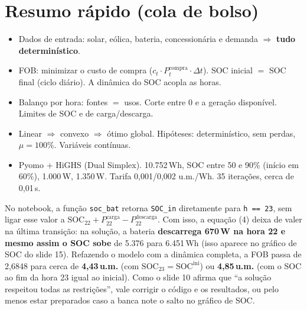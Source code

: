 \documentclass[11pt,a4paper]{article}
\begin{document}
\newpage
\section{Resumo rápido (cola de bolso)}

\begin{tcolorbox}[colback=white, colframe=ufjf, boxrule=0.6pt, arc=2pt]
\begin{itemize}
  \item[\textbf{7}] Dados de entrada: solar, eólica, bateria, concessionária e demanda $\Rightarrow$ \textbf{tudo determinístico}.
  \item[\textbf{8}] FOB: minimizar o custo de compra ($c_t \cdot P^{\text{compra}}_t \cdot \Delta t$).
        SOC inicial $=$ SOC final (ciclo diário). A dinâmica do SOC acopla as horas.
  \item[\textbf{9}] Balanço por hora: fontes $=$ usos. Corte entre $0$ e a geração disponível. Limites de SOC e de
        carga/descarga.
  \item[\textbf{10}] Linear $\Rightarrow$ convexo $\Rightarrow$ ótimo global. Hipóteses: determinístico, sem perdas,
        $\mu = 100\%$. Variáveis contínuas.
  \item[\textbf{11}] Pyomo + HiGHS (Dual Simplex). 10.752\,Wh, SOC entre 50 e 90\% (início em 60\%), 1.000\,W,
        1.350\,W. Tarifa 0,001/0,002 u.m./Wh. 35 iterações, cerca de 0,01\,s.
\end{itemize}
\end{tcolorbox}

\begin{alerta}
No notebook, a função \texttt{soc\_bat} retorna \texttt{SOC\_in} diretamente para \texttt{h == 23}, sem ligar
esse valor a $\mathrm{SOC}_{22} + P^{\text{carga}}_{22} - P^{\text{descarga}}_{22}$. Com isso, a equação (4)
deixa de valer na última transição: na solução, a bateria \textbf{descarrega 670\,W na hora 22 e mesmo assim o SOC
sobe} de 5.376 para 6.451\,Wh (isso aparece no gráfico de SOC do slide 15). Refazendo o modelo com a dinâmica
completa, a FOB passa de 2,6848 para cerca de \textbf{4,43\,u.m.} (com $\mathrm{SOC}_{23} = \mathrm{SOC}^{\text{ini}}$)
ou \textbf{4,85\,u.m.} (com o SOC ao fim da hora 23 igual ao inicial). Como o slide 10 afirma que ``a solução
respeitou todas as restrições'', vale corrigir o código e os resultados, ou pelo menos estar preparados caso a
banca note o salto no gráfico de SOC.
\end{alerta}
\end{document}
